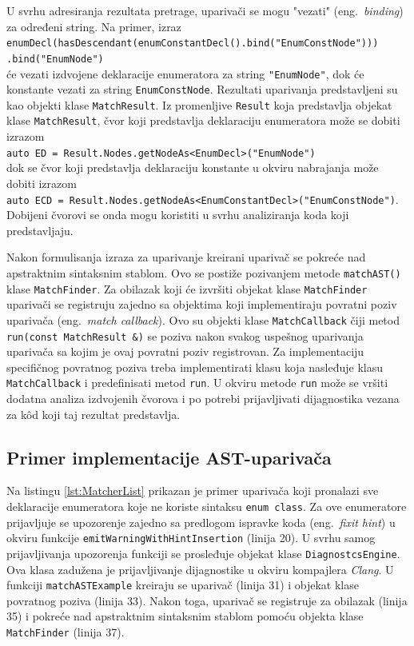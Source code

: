 \documentclass[12pt,oneside]{memoir}
\begin{document}
U svrhu adresiranja rezultata pretrage, upariva\v{c}i se mogu "vezati" (eng.~\textit{binding}) za određeni string. Na primer, izraz \\
\texttt{enumDecl(hasDescendant(enumConstantDecl().bind("EnumConstNode")))} \\
\hspace*{9cm}\texttt{.bind("EnumNode")} \\ će vezati izdvojene deklaracije enumeratora za string \texttt{"EnumNode"}, dok \'{c}e konstante vezati za string \texttt{EnumConstNode}. Rezultati uparivanja predstavljeni su kao objekti klase \texttt{MatchResult}. Iz promenljive \texttt{Result} koja predstavlja objekat klase \texttt{MatchResult}, \v{c}vor koji predstavlja deklaraciju enumeratora
mo\v{z}e se dobiti izrazom \\ \texttt{auto ED = Result.Nodes.getNodeAs<EnumDecl>("EnumNode")} \\
dok se \v{c}vor koji predstavlja deklaraciju konstante u okviru nabrajanja mo\v{z}e dobiti izrazom \\ \texttt{auto ECD = Result.Nodes.getNodeAs<EnumConstantDecl>("EnumConstNode")}.\\ Dobijeni \v{c}vorovi se onda mogu koristiti u svrhu analiziranja
koda koji predstavljaju.

\par
Nakon formulisanja izraza za uparivanje kreirani upariva\v{c} se pokre\'{c}e nad apstraktnim sintaksnim stablom. Ovo se posti\v{z}e pozivanjem metode \texttt{matchAST()} klase \texttt{MatchFinder}. 
Za obilazak koji \'{c}e izvr\v{s}iti objekat klase \texttt{MatchFinder} upariva\v{c}i se registruju zajedno sa objektima koji implementiraju povratni poziv upariva\v{c}a (eng.~\textit{match callback}). 
Ovo su objekti klase \texttt{MatchCallback} \v{c}iji metod \texttt{run(const MatchResult \&)} se poziva nakon svakog uspe\v{s}nog uparivanja 
upariva\v{c}a sa kojim je ovaj povratni poziv registrovan. Za implementaciju specifi\v{c}nog povratnog poziva treba implementirati klasu koja nasleđuje klasu \texttt{MatchCallback} i predefinisati metod \texttt{run}. U okviru metode \texttt{run} mo\v{z}e se vr\v{s}iti dodatna analiza izdvojenih \v{c}vorova i po potrebi
prijavljivati dijagnostika vezana za k\^{o}d koji taj rezultat predstavlja. 
\subsection{Primer implementacije AST-upariva\v{c}a}
Na listingu \ref{lst:MatcherList} prikazan je primer upariva\v{c}a koji pronalazi sve deklaracije enumeratora koje ne koriste sintaksu \texttt{enum class}. Za ove enumeratore prijavljuje se upozorenje zajedno sa predlogom ispravke koda (eng.~\textit{fixit hint}) u okviru funkcije \texttt{emitWarningWithHintInsertion} (linija 20). U svrhu samog
prijavljivanja upozorenja funkciji se prosleđuje objekat klase \texttt{DiagnostcsEngine}. Ova klasa zadu\v{z}ena je prijavljivanje dijagnostike u okviru kompajlera \textit{Clang}. U funkciji \texttt{matchASTExample} kreiraju se upariva\v{c} (linija 31) i objekat klase povratnog poziva (linija 33). Nakon toga, upariva\v{c} se registruje za obilazak (linija 35) i pokre\'{c}e nad apstraktnim sintaksnim stablom pomo\'{c}u objekta klase \texttt{MatchFinder} (linija 37).
\end{document}
